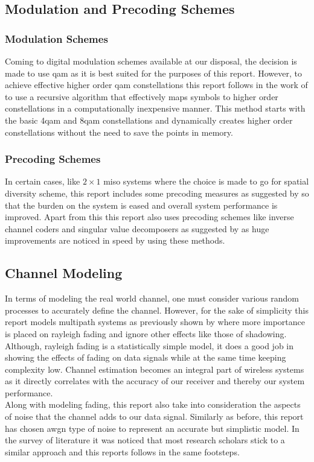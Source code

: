 \subsection{Modulation and Precoding Schemes}

\subsubsection{Modulation Schemes}
Coming to digital modulation schemes available at our disposal, the decision is made to use \acrshort{qam} as it is best suited for the purposes of this report. However, to achieve effective higher order \acrshort{qam} constellations this report follows in the work of \textcite{Bellili2015} to use a recursive algorithm that effectively maps symbols to higher order constellations in a computationally inexpensive manner. This method starts with the basic 4\acrshort{qam} and 8\acrshort{qam} constellations and dynamically creates higher order constellations without the need to save the points in memory.

\subsubsection{Precoding Schemes}
In certain cases, like $2 \times 1$ \acrshort{miso} systems where the choice is made to go for \gls{spatial diversity} scheme, this report includes some precoding measures as suggested by \textcite{Alamouti1998} so that the burden on the system is eased and overall system performance is improved. Apart from this this report also uses precoding schemes like inverse channel coders and singular value decomposers as suggested by \textcite{Klema1980} as huge improvements are noticed in speed by using these methods.

\subsection{Channel Modeling}
In terms of modeling the real world channel, one must consider various random processes to accurately define the channel. However, for the sake of simplicity this report models multipath systems as previously shown by \textcite{Hanlen2006} where more importance is placed on \gls{rayleigh fading} and ignore other effects like those of shadowing. Although, \gls{rayleigh fading} is a statistically simple model, it does a good job in showing the effects of fading on data signals while at the same time keeping complexity low. Channel estimation becomes an integral part of wireless systems as it directly correlates with the accuracy of our receiver and thereby our system performance.\\
Along with modeling fading, this report also take into consideration the aspects of noise that the channel adds to our data signal. Similarly as before, this report has chosen \acrshort{awgn} type of noise to represent an accurate but simplistic model. In the survey of literature it was noticed that most research scholars stick to a similar approach and this reports follows in the same footsteps.


